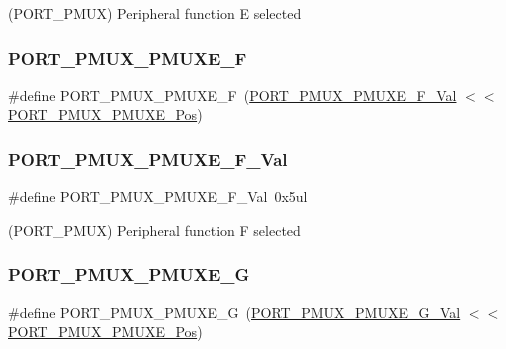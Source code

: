 (P\+O\+R\+T\+\_\+\+P\+M\+UX) Peripheral function E selected 

\mbox{\label{group___s_a_m_d21___p_o_r_t_ga35ca2fd02cfd84af0d0a2d1f417bc342}} 
\subsubsection{\texorpdfstring{PORT\_PMUX\_PMUXE\_F}{PORT\_PMUX\_PMUXE\_F}}
{\footnotesize\ttfamily \#define P\+O\+R\+T\+\_\+\+P\+M\+U\+X\+\_\+\+P\+M\+U\+X\+E\+\_\+F~(\mbox{\hyperlink{group___s_a_m_d21___p_o_r_t_ga7ef931d6a0d370d5ee0b1b4eb87c5e80}{P\+O\+R\+T\+\_\+\+P\+M\+U\+X\+\_\+\+P\+M\+U\+X\+E\+\_\+\+F\+\_\+\+Val}}         $<$$<$ \mbox{\hyperlink{group___s_a_m_d21___p_o_r_t_ga38a4c4871ecabeb4ad36398b73685bac}{P\+O\+R\+T\+\_\+\+P\+M\+U\+X\+\_\+\+P\+M\+U\+X\+E\+\_\+\+Pos}})}

\mbox{\label{group___s_a_m_d21___p_o_r_t_ga7ef931d6a0d370d5ee0b1b4eb87c5e80}} 
\subsubsection{\texorpdfstring{PORT\_PMUX\_PMUXE\_F\_Val}{PORT\_PMUX\_PMUXE\_F\_Val}}
{\footnotesize\ttfamily \#define P\+O\+R\+T\+\_\+\+P\+M\+U\+X\+\_\+\+P\+M\+U\+X\+E\+\_\+\+F\+\_\+\+Val~0x5ul}



(P\+O\+R\+T\+\_\+\+P\+M\+UX) Peripheral function F selected 

\mbox{\label{group___s_a_m_d21___p_o_r_t_ga2fc8ecf2f999e23a5bfd539423bb9286}} 
\subsubsection{\texorpdfstring{PORT\_PMUX\_PMUXE\_G}{PORT\_PMUX\_PMUXE\_G}}
{\footnotesize\ttfamily \#define P\+O\+R\+T\+\_\+\+P\+M\+U\+X\+\_\+\+P\+M\+U\+X\+E\+\_\+G~(\mbox{\hyperlink{group___s_a_m_d21___p_o_r_t_gaf640a2651a423568c43db1fe4f09296c}{P\+O\+R\+T\+\_\+\+P\+M\+U\+X\+\_\+\+P\+M\+U\+X\+E\+\_\+\+G\+\_\+\+Val}}         $<$$<$ \mbox{\hyperlink{group___s_a_m_d21___p_o_r_t_ga38a4c4871ecabeb4ad36398b73685bac}{P\+O\+R\+T\+\_\+\+P\+M\+U\+X\+\_\+\+P\+M\+U\+X\+E\+\_\+\+Pos}})}

